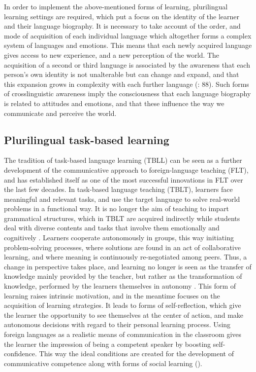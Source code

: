 \documentclass[output=paper]{../langscibook}
\begin{document}
In order to implement the above-mentioned forms of learning, plurilingual learning settings are required, which put a focus on the identity of the learner and their language biography. It is necessary to take account of the order, and mode of acquisition of each individual language which altogether forms a complex system of languages and emotions. This means that each newly acquired language gives access to new experience, and a new perception of the world. The acquisition of a second or third language is associated by the awareness that each person’s own identity is not unalterable but can change and expand, and that this expansion grows in complexity with each further language (\citealt{ReichKrumm2013}: 88). Such forms of crosslinguistic awareness imply the consciousness that each language biography is related to attitudes and emotions, and that these influence the way we communicate and perceive the world.

\subsection{Plurilingual task-based learning}

The tradition of task-based language learning (TBLL) can be seen as a further development of the communicative approach to foreign-language teaching (FLT), and has established itself as one of the most successful innovations in FLT over the last few decades. In task-based language teaching (TBLT), learners face meaningful and relevant tasks, and use the target language to solve real-world problems in a functional way. It is no longer the aim of teaching to impart grammatical structures, which in TBLT are acquired indirectly while students deal with diverse contents and tasks that involve them emotionally and cognitively \citep{Hallet2012}. Learners cooperate autonomously in groups, this way initiating problem-solving processes, where solutions are found in an act of collaborative learning, and where meaning is continuously re-negotiated among peers. Thus, a change in perspective takes place, and learning no longer is seen as the transfer of knowledge mainly provided by the teacher, but rather as the transformation of knowledge, performed by the learners themselves in autonomy \citep{Ellis2003}. This form of learning raises intrinsic motivation, and in the meantime focuses on the acquisition of learning strategies. It leads to forms of self-reflection, which give the learner the opportunity to see themselves at the center of action, and make autonomous decisions with regard to their personal learning process. Using foreign languages as a realistic means of communication in the classroom gives the learner the impression of being a competent speaker by boosting self-confidence. This way the ideal conditions are created for the development of communicative competence along with forms of social learning (\citealt[84f]{Dewaele2010}). 
\end{document}
